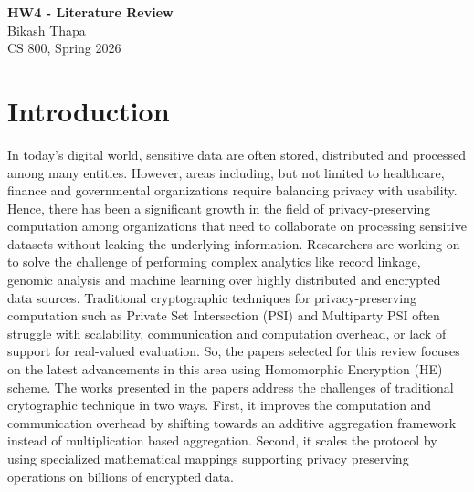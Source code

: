 \documentclass[12pt]{article}
\begin{document}
\begin{centering}
{\large\textbf{HW4 - Literature Review}}\\
\vspace{3mm} %
Bikash Thapa\\
CS 800, Spring 2026\\
\end{centering}



\section{Introduction}
In today's digital world, sensitive data are often stored, distributed and processed among many entities. However, areas including, but not limited to healthcare, finance and governmental organizations require balancing privacy with usability. Hence, there has been a significant growth in the field of privacy-preserving computation among organizations that need to collaborate on processing sensitive datasets without leaking the underlying information. Researchers are working on to solve the challenge of performing complex analytics like record linkage, genomic analysis and machine learning over highly distributed and encrypted data sources. Traditional cryptographic techniques for privacy-preserving computation such as Private Set Intersection (PSI) \cite{chen2017fast} and Multiparty PSI \cite{kolesnikov2017practical} often struggle with scalability, communication and computation overhead, or lack of support for real-valued evaluation. So, the papers selected for this review focuses on the latest advancements in this area using Homomorphic Encryption (HE) scheme. The works presented in the papers address the challenges of traditional crytographic technique in two ways. First, it improves the computation and communication overhead by shifting towards an additive aggregation framework instead of multiplication based aggregation. Second, it scales the protocol by using specialized mathematical mappings supporting privacy preserving operations on billions of encrypted data.
\end{document}
